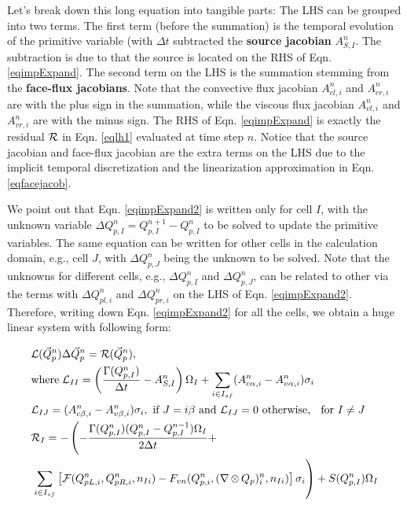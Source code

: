 \documentclass[12pt, letterpaper]{report}
\begin{document}
Let's break down this long equation into tangible parts: The LHS can be grouped into two terms. The
first term (before the summation) is the temporal evolution of the primitive variable (with $\Delta
t$ subtracted the {\bf source jacobian} $A_{S,I}^n$. The subtraction is due to that the source is
located on the RHS of Eqn. \ref{eqimpExpand}. The second term on the LHS is the summation stemming
from the {\bf face-flux jacobians}. Note that the convective flux jacobian $A_{cl,i}^n$ and
$A_{cr,i}^n$ are with the plus sign in the summation, while the viscous flux jacobian $A_{vl,i}^n$
and $A_{vr,i}^n$ are with the minus sign. The RHS of Eqn. \ref{eqimpExpand} is exactly the residual
$\mathcal{R}$ in Eqn. \ref{eqlh1} evaluated at time step $n$. Notice that the source jacobian and face-flux
jacobian are the extra terms on the LHS due to the implicit temporal discretization and the
linearization approximation in Eqn. \ref{eqfacejacob}. \paraspace

We point out that Eqn. \ref{eqimpExpand2} is written only for cell $I$, with the unknown variable
$\Delta Q_{p,I}^n = Q_{p,I}^{n+1} - Q_{p,I}^n$ to be solved to update the primitive variables. The
same equation can be written for other cells in the calculation domain, e.g., cell $J$, with $\Delta
Q_{p,J}^n$ being the unknown to be solved. Note that the unknowns for different cells, e.g.,
$\Delta Q_{p,I}^n$ and $\Delta Q_{p,J}^n$, can be related to other via the terms with $\Delta
Q_{pl,i}^n$ and $\Delta Q_{pr,i}^n$ on the LHS of Eqn. \ref{eqimpExpand2}. Therefore, writing down
Eqn. \ref{eqimpExpand2} for all the cells, we obtain a huge linear system with following form:

\begin{align}\label{eqlh2}
   \begin{split}
      & \mathcal{L}(\vec{Q}_p^n) \Delta \vec{Q}_p^n = \mathcal{R}(\vec{Q}_p^n), \\ & \textrm{where} \; \mathcal{L}_{II} =
      \left(\frac{\Gamma(Q_{p,I}^n)}{\Delta t} - A_{S,I}^n\right)\Omega_I + \sum_{i \in I_{sf}}
      (A_{c\alpha, i}^n - A_{v\alpha, i}^n) \sigma_i \\ &\mathcal{L}_{IJ} = (A_{c\beta,
         i}^n - A_{v\beta, i}^n) \sigma_i,  \textrm{ if } J = i\beta \textrm{ and } \mathcal{L}_{IJ} = 0
         \textrm{ otherwise, }\; \textrm{ for } I \neq J \\ & \mathcal{R}_I = -\left(-\frac{\Gamma(Q_{p,I}^n)
   (Q_{p,I}^n - Q_{p,I}^{n-1})\Omega_I}{2\Delta t} + \right.\\ &\left.\sum_{i \in
   I_{sf}}\left[\mathcal{F}(Q_{pL,i}^n, Q_{pR,i}^n, n_{Ii}) - F_{vn}(Q_{p,i}^n, (\nabla
   \mathop{\otimes} Q_p)_i^n, n_{Ii})\right]\sigma_i\right) + S(Q_{p,I}^n)\Omega_I
   \end{split}
\end{align}
\end{document}
